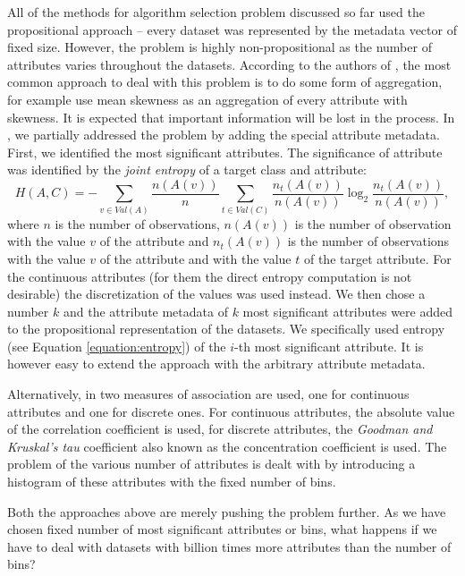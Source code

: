 All of the methods for algorithm selection problem discussed so far used the propositional approach -- every dataset was represented by the metadata vector of fixed size. However, the problem is highly non-propositional as the number of attributes varies throughout the datasets. According to the authors of \cite{BrazdilMetalearning-2009}, the most common approach to deal with this problem is to do some form of aggregation, for example use mean skewness as an aggregation of every attribute with skewness. It is expected that important information will be lost in the process. In \cite{jaOndraMetadataMetric}, we partially addressed the problem by adding the special attribute metadata. First, we identified the most significant attributes. The significance of attribute was identified by the \emph{joint entropy} of a target class and attribute:
\begin{equation}
H(A,C) = - \sum_{v \in Val(A)}\frac{n(A(v))}{n}
\sum_{t \in Val(C)}\frac{n_t(A(v))}{n(A(v))}\log_2\frac{n_t(A(v))}{n(A(v))},
\end{equation}
where $n$ is the number of observations, $n(A(v))$ is the number of observation with the value $v$ of the attribute and $n_t(A(v))$ is the number of observations with the value $v$ of the attribute and with the value $t$ of the target attribute.
For the continuous attributes (for them the direct entropy computation is not desirable) the discretization of the values was used instead. We then chose a number $k$ and the attribute metadata of $k$ most significant attributes were added to the propositional representation of the datasets. We specifically used entropy (see Equation \ref{equation:entropy}) of the $i$-th most significant attribute.
It is however easy to extend the approach with the arbitrary attribute metadata.

Alternatively, in \cite{KalousisDesignImplementationAndPerfromance} two measures of association are used, one for continuous attributes and one for discrete ones. For continuous attributes, the absolute value of the correlation coefficient is used, for discrete attributes, the \textit{Goodman and Kruskal's tau} \cite{AgrestiCategoricalDataAnalysis} coefficient also known as the concentration coefficient is used. The problem of the various number of attributes is dealt with by introducing a histogram of these attributes with the fixed number of bins.

Both the approaches above are merely pushing the problem further. As we have chosen fixed number of most significant attributes or bins, what happens if we have to deal with datasets with billion times more attributes than the number of bins?

